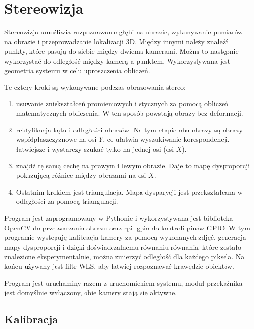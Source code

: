 \documentclass[magisterska]{pracadypl}
\begin{document}
\chapter{Stereowizja}

Stereowizja umożliwia rozpoznawanie głębi na obrazie, wykonywanie pomiarów na obrazie
i przeprowadzanie lokalizacji 3D. Między innymi należy znaleźć punkty, które pasują do siebie między dwiema kamerami. Można to następnie wykorzystać do odległość między kamerą a punktem. Wykorzystywana jest geometria systemu w celu uproszczenia obliczeń.

Te cztery kroki są wykonywane podczas obrazowania stereo:

\begin{enumerate}
  \item usuwanie zniekształceń promieniowych i stycznych za pomocą obliczeń matematycznych
obliczenia. W ten sposób powstają obrazy bez deformacji.
  \item rektyfikacja kąta i odległości obrazów. Na tym etapie oba obrazy są
obrazy współpłaszczyznowe na osi $Y$, co ułatwia wyszukiwanie korespondencji.
łatwiejsze i wystarczy szukać tylko na jednej osi (osi $X$).
  \item znajdź tę samą cechę na prawym i lewym obrazie. Daje to mapę dysproporcji pokazującą różnice między obrazami na osi $X$.
  \item Ostatnim krokiem jest triangulacja. Mapa dysparycji jest przekształcana w odległości za pomocą triangulacji.
\end{enumerate}

Program jest zaprogramowany w Pythonie i wykorzystywana jest biblioteka OpenCV do przetwarzania obrazu oraz rpi-lgpio do kontroli pinów GPIO.
W tym programie wystepuję kalibracja kamery za pomocą wykonanych zdjęć, generacja mapy dysproporcji i dzięki doświadczalnemu równaniu równania, które zostało znalezione eksperymentalnie, można zmierzyć odległość dla każdego piksela. Na końcu używany jest filtr WLS, aby łatwiej rozpoznawać krawędzie obiektów.

Program jest uruchaminy razem z uruchomieniem systemu, moduł przekaźnika jest domyślnie wyłączony, obie kamery stają się aktywne.

\section{Kalibracja}
\end{document}
